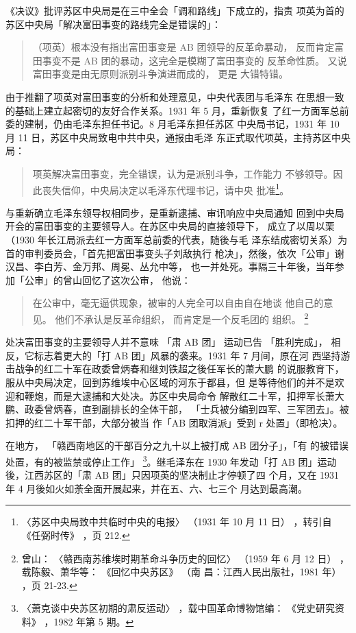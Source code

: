 《决议》批评苏区中央局是在三中全会「调和路线」下成立的，指责
项英为首的苏区中央局「解决富田事变的路线完全是错误的」：
\begin{quote}
	\fzwkai （项英）根本没有指出富田事变是 AB 团领导的反革命暴动，
反而肯定富田事变不是 AB 团的暴动，这完全是模糊了富田事变的
反革命性质。
又说富田事变是由无原则派别斗争演进而成的，
更是
大错特错。
\end{quote}

由于推翻了项英对富田事变的分析和处理意见，中央代表团与毛泽东
在思想一致的基础上建立起密切的友好合作关系。1931 年 5 月，重新恢复
了红一方面军总前委的建制，仍由毛泽东担任书记。8 月毛泽东担任苏区
中央局书记，1931 年 10 月 11 日，苏区中央局致电中共中央，通报由毛泽
东正式取代项英，主持苏区中央局：
\begin{quote}
	\fzwkai 项英解决富田事变，完全错误，认为是派别斗争，工作能力
不够领导。因此丧失信仰，中央局决定以毛泽东代理书记，请中央
批准\footnote{〈苏区中央局致中共临时中央的电报〉
（1931 年 10 月 11 日）
，转引自《任弼时传》
，页 212.}。
\end{quote}

与重新确立毛泽东领导权相同步，是重新逮捕、审讯响应中央局通知
回到中央局开会的富田事变的主要领导人。在苏区中央局的直接领导下，
成立了以周以栗（1930 年长江局派去红一方面军总前委的代表，随後与毛
泽东结成密切关系）为首的审判委员会，「首先把富田事变头子刘敌执行
枪决」，然後，依次「公审」谢汉昌、李白芳、金万邦、周冕、丛允中等，
也一并处死。事隔三十年後，当年参加「公审」的曾山回忆了这次公审，
他说：
\begin{quote}
	\fzwkai 在公审中，毫无逼供现象，被审的人完全可以自由自在地谈
他自己的意见。
他们不承认是反革命组织，
而肯定是一个反毛团的
组织。
\footnote{ 曾山：
〈赣西南苏维埃时期革命斗争历史的回忆〉
（1959 年 6 月 12 日）
，载陈毅、萧华等：
《回忆中央苏区》
（南
昌：江西人民出版社，1981 年）
，页 21-23.}
\end{quote}

处决富田事变的主要领导人并不意味
「肃 AB 团」
运动已告
「胜利完成」，
相反，它标志着更大的「打 AB 团」风暴的袭来。1931 年 7 月间，原在河
西坚持游击战争的红二十军在政委曾炳春和继刘铁超之後任军长的萧大鹏
的说服教育下，服从中央局决定，回到苏维埃中心区域的河东于都县，但
是等待他们的并不是欢迎和鞭炮，而是大逮捕和大处决。苏区中央局命令
解散红二十军，扣押军长萧大鹏、政委曾炳春，直到副排长的全体干部，
「士兵被分编到四军、三军团去」。被扣押的红二十军干部，大部分被当
作「AB 团取消派」受到 r 处置」（即枪决）。

在地方，
「赣西南地区的干部百分之九十以上被打成 AB 团分子」，「有
的被错误处置，有的被监禁或停止工作」 \footnote{〈萧克谈中央苏区初期的肃反运动〉
，载中国革命博物馆编：
《党史研究资料》
，1982 年第 5 期。}。继毛泽东在 1930 年发动「打
AB 团」运动後，江西苏区的「肃 AB 团」只因项英的坚决制止才停顿了四
个月，又在 1931 年 4 月後如火如荼全面开展起来，并在五、六、七三个
月达到最高潮。
 
